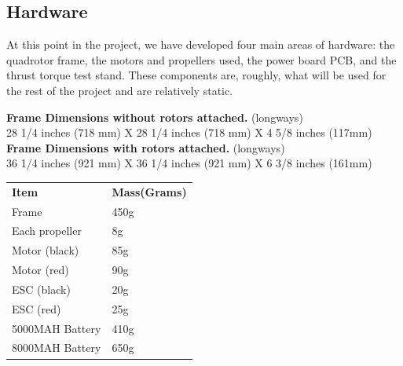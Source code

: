 \documentclass{article}
\numberwithin{equation}{section} %
\begin{document}

\subsection{Hardware}
At this point in the project, we have developed four main areas of hardware: the quadrotor frame, the motors and propellers used, the power board PCB, and the thrust torque test stand. These components are, roughly, what will be used for the rest of the project and are relatively static. 

\begin{center}
{\bf Frame Dimensions without rotors attached.} (longways) \\
28 1/4 inches (718 mm) X 28 1/4 inches (718 mm) X 4 5/8 inches (117mm)
\\ \bigskip
{\bf Frame Dimensions with rotors attached.} (longways) \\
36 1/4 inches (921 mm) X 36 1/4 inches (921 mm) X 6 3/8 inches (161mm)
\end{center}

\begin{longtable}{l l}
	\textbf{Item} & \textbf{Mass(Grams)} \\
	Frame			& 450g \\
	Each propeller	& 8g \\
	Motor (black)		& 85g \\
	Motor (red)		& 90g \\
	ESC (black)		& 20g \\
	ESC (red)		& 25g \\
	5000MAH Battery	& 410g \\
	8000MAH Battery	& 650g \\
\end{longtable}
\end{document}
